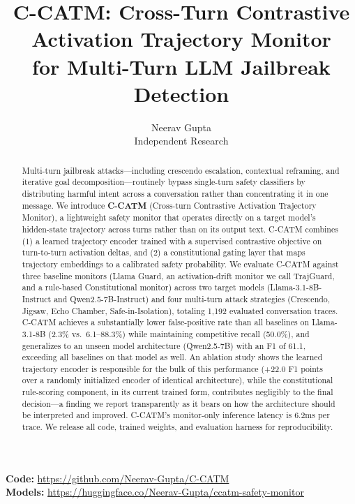 \documentclass[11pt]{article}
\title{C-CATM: Cross-Turn Contrastive Activation Trajectory Monitor \\ for Multi-Turn LLM Jailbreak Detection}
\author{Neerav Gupta \\ \normalsize Independent Research}
\date{}
\begin{document}
\maketitle

\begin{center}
\textbf{Code:} \url{https://github.com/Neerav-Gupta/C-CATM} \\
\textbf{Models:} \url{https://huggingface.co/Neerav-Gupta/ccatm-safety-monitor}
\end{center}

\begin{abstract}
Multi-turn jailbreak attacks---including crescendo escalation, contextual reframing, and iterative goal decomposition---routinely bypass single-turn safety classifiers by distributing harmful intent across a conversation rather than concentrating it in one message. We introduce \textbf{C-CATM} (Cross-turn Contrastive Activation Trajectory Monitor), a lightweight safety monitor that operates directly on a target model's hidden-state trajectory across turns rather than on its output text. C-CATM combines (1) a learned trajectory encoder trained with a supervised contrastive objective on turn-to-turn activation deltas, and (2) a constitutional gating layer that maps trajectory embeddings to a calibrated safety probability. We evaluate C-CATM against three baseline monitors (Llama Guard, an activation-drift monitor we call TrajGuard, and a rule-based Constitutional monitor) across two target models (Llama-3.1-8B-Instruct and Qwen2.5-7B-Instruct) and four multi-turn attack strategies (Crescendo, Jigsaw, Echo Chamber, Safe-in-Isolation), totaling 1{,}192 evaluated conversation traces. C-CATM achieves a substantially lower false-positive rate than all baselines on Llama-3.1-8B (2.3\% vs.\ 6.1--88.3\%) while maintaining competitive recall (50.0\%), and generalizes to an unseen model architecture (Qwen2.5-7B) with an F1 of 61.1, exceeding all baselines on that model as well. An ablation study shows the learned trajectory encoder is responsible for the bulk of this performance (+22.0 F1 points over a randomly initialized encoder of identical architecture), while the constitutional rule-scoring component, in its current trained form, contributes negligibly to the final decision---a finding we report transparently as it bears on how the architecture should be interpreted and improved. C-CATM's monitor-only inference latency is 6.2ms per trace. We release all code, trained weights, and evaluation harness for reproducibility.
\end{abstract}
\end{document}
